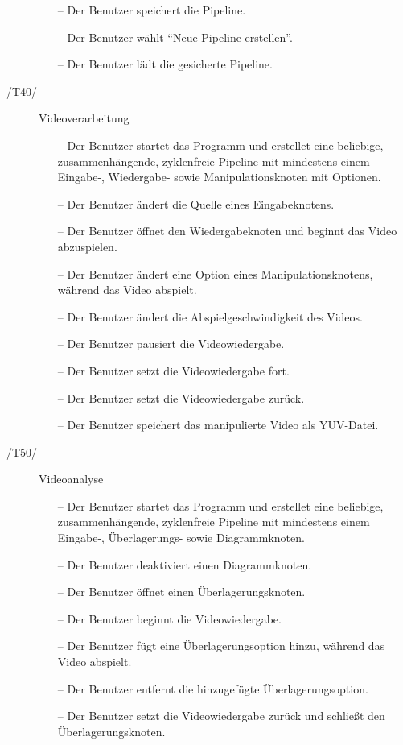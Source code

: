 \begin{description}
\begin{itemize}
			\item[--] Der Benutzer speichert die Pipeline.
			\item[--] Der Benutzer wählt ``Neue Pipeline erstellen''.
			\item[--] Der Benutzer lädt die gesicherte Pipeline.
		\end{itemize}
\newpage
	\item[/T40/] Videoverarbeitung
		\begin{itemize}
			\item[--] Der Benutzer startet das Programm und erstellet eine beliebige, zusammenhängende, zyklenfreie Pipeline mit mindestens einem Eingabe-, Wiedergabe- sowie 
				Manipulationsknoten mit Optionen.
			\item[--] Der Benutzer ändert die Quelle eines Eingabeknotens.
			\item[--] Der Benutzer öffnet den Wiedergabeknoten und beginnt das Video abzuspielen.
			\item[--] Der Benutzer ändert eine Option eines Manipulationsknotens, während das Video abspielt.
			\item[--] Der Benutzer ändert die Abspielgeschwindigkeit des Videos.
			\item[--] Der Benutzer pausiert die Videowiedergabe.
			\item[--] Der Benutzer setzt die Videowiedergabe fort.
			\item[--] Der Benutzer setzt die Videowiedergabe zurück.
			\item[--] Der Benutzer speichert das manipulierte Video als YUV-Datei.
		\end{itemize}
	\item[/T50/] Videoanalyse
		\begin{itemize}
			\item[--] Der Benutzer startet das Programm und erstellet eine beliebige, zusammenhängende, zyklenfreie Pipeline mit mindestens einem Eingabe-, Überlagerungs- sowie 
				Diagrammknoten.
			\item[--] Der Benutzer deaktiviert einen Diagrammknoten.
			\item[--] Der Benutzer öffnet einen Überlagerungsknoten.
			\item[--] Der Benutzer beginnt die Videowiedergabe.
			\item[--] Der Benutzer fügt eine Überlagerungsoption hinzu, während das Video abspielt.
			\item[--] Der Benutzer entfernt die hinzugefügte Überlagerungsoption.
			\item[--] Der Benutzer setzt die Videowiedergabe zurück und schließt den Überlagerungsknoten.

\end{itemize}
\end{description}
